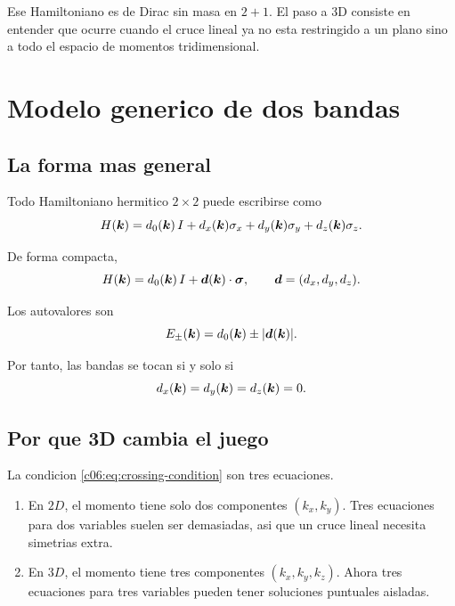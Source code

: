 Ese Hamiltoniano es de Dirac sin masa en \(2+1\). El paso a 3D consiste en entender que ocurre cuando el cruce lineal ya no esta restringido a un plano sino a todo el espacio de momentos tridimensional.

\section{Modelo generico de dos bandas}

\subsection{La forma mas general}

Todo Hamiltoniano hermitico \(2\times 2\) puede escribirse como
\begin{equation}
H(\bm{k})= d_0(\bm{k})\,I + d_x(\bm{k})\sigma_x + d_y(\bm{k})\sigma_y + d_z(\bm{k})\sigma_z.
\label{c06:eq:generic2band}
\end{equation}

De forma compacta,
\begin{equation}
H(\bm{k})=d_0(\bm{k})\,I + \bm{d}(\bm{k})\cdot\bm{\sigma},
\qquad
\bm{d}=(d_x,d_y,d_z).
\end{equation}

Los autovalores son
\begin{equation}
E_\pm(\bm{k})=d_0(\bm{k})\pm |\bm{d}(\bm{k})|.
\label{c06:eq:generic-dispersion}
\end{equation}

Por tanto, las bandas se tocan si y solo si
\begin{equation}
d_x(\bm{k})=d_y(\bm{k})=d_z(\bm{k})=0.
\label{c06:eq:crossing-condition}
\end{equation}

\subsection{Por que 3D cambia el juego}

La condicion \eqref{c06:eq:crossing-condition} son tres ecuaciones.

\begin{enumerate}[leftmargin=*]
  \item En \(2D\), el momento tiene solo dos componentes \((k_x,k_y)\). Tres ecuaciones para dos variables suelen ser demasiadas, asi que un cruce lineal necesita simetrias extra.
  \item En \(3D\), el momento tiene tres componentes \((k_x,k_y,k_z)\). Ahora tres ecuaciones para tres variables pueden tener soluciones puntuales aisladas.
\end{enumerate}

